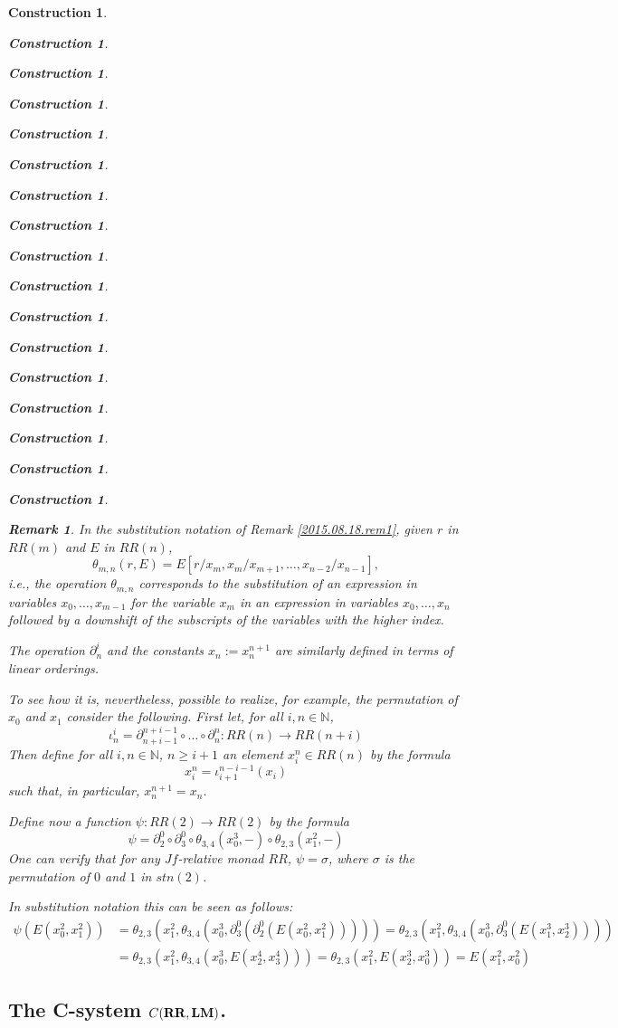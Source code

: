 \documentclass[12pt]{amsart}
\newtheorem{remark}[proposition]{Remark}
\numberwithin{proposition}{subsection}
\newtheorem{construction}[proposition]{Construction}
\newcommand{\llabel}[1]{\label{#1}}
\newcommand{\sr}{\rightarrow}
\newcommand{\nn}{{\mathbb N}}
\newcommand{\nat}{\nn}
\newcommand{\RR}{{\bf RR}}
\newcommand{\LM}{{\bf LM}}
\begin{document}
\begin{construction}
\begin{construction}
\begin{construction}
\begin{construction}
\begin{construction}
\begin{construction}
\begin{construction}
\begin{construction}
\begin{construction}
\begin{construction}
\begin{construction}
\begin{construction}
\begin{construction}
\begin{construction}
\begin{construction}
\begin{construction}
\begin{construction}
\begin{remark}
In the substitution notation of Remark \ref{2015.08.18.rem1}, given $r$ in
$RR(m)$ and $E$ in $RR(n)$,
%
$$\theta_{m,n}(r,E)=E[r/x_m,x_m/x_{m+1},\dots,x_{n-2}/x_{n-1}],$$
%
i.e., the operation $\theta_{m,n}$ corresponds to the substitution of an
expression in variables $x_0,\dots,x_{m-1}$ for the variable $x_m$ in an
expression in variables $x_0,\dots,x_n$ followed by a downshift of the subscripts
of the variables with the higher index.

The operation $\partial_n^i$ and the constants $x_n:=x^{n+1}_{n}$ are similarly
defined in terms of linear orderings.

To see how it is, nevertheless, possible to realize, for example, the
permutation of $x_0$ and $x_1$ consider the following. First let, for all
$i,n\in\nat$,
%
$$\iota_n^i=\partial_{n+i-1}^{n+i-1}\circ \dots\circ \partial_n^n:RR(n)\sr RR(n+i)$$
%
Then define for all $i,n\in\nat$, $n\ge i+1$ an element $x^n_i\in RR(n)$ by the formula
%
$$x^n_i=\iota_{i+1}^{n-i-1}(x_i)$$
%
such that, in particular, $x^{n+1}_{n}=x_n$.

Define now a function $\psi:RR(2)\sr RR(2)$ by the formula
%
$$\psi=\partial^0_2\circ \partial^0_3\circ \theta_{3,4}(x_0^3,-)\circ \theta_{2,3}(x_1^2,-)$$
%
One can verify that for any $Jf$-relative monad $RR$, $\psi=\sigma$, where
$\sigma$ is the permutation of $0$ and $1$ in $stn(2)$.

In substitution notation this can be seen as follows:
\begin{equation*}
  \begin{split}
    \psi(E(x^2_0,x_1^2))&=\theta_{2,3}(x_1^2,\theta_{3,4}(x_0^3,\partial^0_3(\partial^0_2(E(x^2_0,x_1^2)))))=\theta_{2,3}(x_1^2,\theta_{3,4}(x_0^3,\partial^0_3(E(x^3_1,x^3_2))))
    \\&=\theta_{2,3}(x_1^2,\theta_{3,4}(x_0^3,E(x^4_2,x^4_3)))=\theta_{2,3}(x_1^2,E(x^3_2,x^3_0))=E(x^2_1,x^2_0)
  \end{split}
\end{equation*}
\end{remark}
%

\subsection{The C-system $C(\RR,\LM)$.}
%
\llabel{CRRLM}


\end{construction}
\end{construction}
\end{construction}
\end{construction}
\end{construction}
\end{construction}
\end{construction}
\end{construction}
\end{construction}
\end{construction}
\end{construction}
\end{construction}
\end{construction}
\end{construction}
\end{construction}
\end{construction}
\end{construction}
\end{document}
